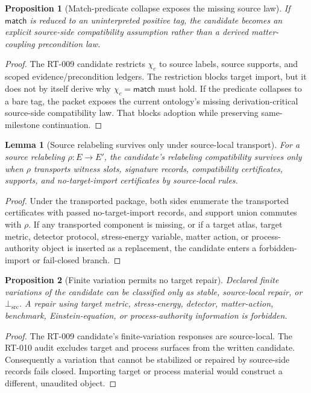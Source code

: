 \documentclass[11pt]{article}
\newcommand{\BottomSrc}{\bot_{\mathrm{src}}}
\newtheorem{lemma}{Lemma}
\newtheorem{proposition}{Proposition}
\begin{document}
\begin{proposition}[Match-predicate collapse exposes the missing source law]
If \(\mathsf{match}\) is reduced to an uninterpreted positive tag, the
candidate becomes an explicit source-side compatibility assumption rather
than a derived matter-coupling precondition law.
\end{proposition}

\begin{proof}
The RT-009 candidate restricts \(\chi_c\) to source labels, source supports,
and scoped evidence/precondition ledgers. The restriction blocks target
import, but it does not by itself derive why \(\chi_c=\mathsf{match}\) must
hold. If the predicate collapses to a bare tag, the packet exposes the current
ontology's missing derivation-critical source-side compatibility law. That
blocks adoption while preserving same-milestone continuation.
\end{proof}

\begin{lemma}[Source relabeling survives only under source-local transport]
For a source relabeling \(\rho:E\to E'\), the candidate's relabeling
compatibility survives only when \(\rho\) transports witness slots, signature
records, compatibility certificates, supports, and no-target-import
certificates by source-local rules.
\end{lemma}

\begin{proof}
Under the transported package, both sides enumerate the transported
certificates with passed no-target-import records, and support union commutes
with \(\rho\). If any transported component is missing, or if a target atlas,
target metric, detector protocol, stress-energy variable, matter action, or
process-authority object is inserted as a replacement, the candidate enters a
forbidden-import or fail-closed branch.
\end{proof}

\begin{proposition}[Finite variation permits no target repair]
Declared finite variations of the candidate can be classified only as stable,
source-local repair, or \(\BottomSrc\). A repair using target metric,
stress-energy, detector, matter-action, benchmark, Einstein-equation, or
process-authority information is forbidden.
\end{proposition}

\begin{proof}
The RT-009 candidate's finite-variation responses are source-local. The
RT-010 audit excludes target and process surfaces from the written candidate.
Consequently a variation that cannot be stabilized or repaired by source-side
records fails closed. Importing target or process material would construct a
different, unaudited object.
\end{proof}
\end{document}
